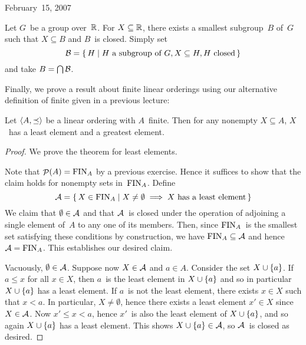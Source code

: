\begin{lecture}{February~15, 2007}
\begin{example}
Let \(G\)~be a group over~\(\mathbb{R}\). For \(X\subseteq\mathbb{R}\), there exists a smallest subgroup~\(B\) of~\(G\) such that \(X\subseteq B\) and \(B\)~is closed. Simply set
\[\mathcal{B}=\{\,H\mid H\text{ a subgroup of }G, X\subseteq H, H\text{ closed}\,\}\]
and take \(B=\bigcap\mathcal{B}\).
\end{example}

Finally, we prove a result about finite linear orderings using our alternative definition of finite given in a previous lecture:
\begin{thm}
Let \(\langle{A},{\preceq}\rangle\) be a linear ordering with \(A\)~finite. Then for any nonempty \(X\subseteq A\), \(X\)~has a least element and a greatest element.
\end{thm}
\begin{proof}
We prove the theorem for least elements.

Note that \(\mathop{\mathcal{P}}(A)=\operatorname{FIN}_A\) by a previous exercise. Hence it suffices to show that the claim holds for nonempty sets in~\(\operatorname{FIN}_A\). Define
\[\mathcal{A}=\{\,X\in\operatorname{FIN}_A\mid X\ne\emptyset\implies X\text{ has a least element}\,\}\]
We claim that \(\emptyset\in\mathcal{A}\) and that \(\mathcal{A}\)~is closed under the operation of adjoining a single element of~\(A\) to any one of its members. Then, since \(\operatorname{FIN}_A\)~is the smallest set satisfying these conditions by construction, we have \(\operatorname{FIN}_A\subseteq\mathcal{A}\) and hence \(\mathcal{A}=\operatorname{FIN}_A\). This establishes our desired claim.

Vacuously, \(\emptyset\in\mathcal{A}\). Suppose now \(X\in\mathcal{A}\) and \(a\in A\). Consider the set \(X\cup\{a\}\). If \(a\le x\) for all \(x\in X\), then \(a\)~is the least element in \(X\cup\{a\}\) and so in particular \(X\cup\{a\}\) has a least element. If \(a\)~is not the least element, there exists \(x\in X\) such that \(x<a\). In particular, \(X\ne\emptyset\), hence there exists a least element \(x'\in X\) since \(X\in\mathcal{A}\). Now \(x'\le x<a\), hence \(x'\)~is also the least element of \(X\cup\{a\}\), and so again \(X\cup\{a\}\) has a least element. This shows \(X\cup\{a\}\in\mathcal{A}\), so \(\mathcal{A}\)~is closed as desired.
\end{proof}
\end{lecture}

